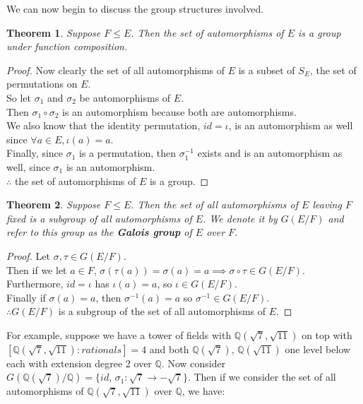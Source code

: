 \documentclass[11pt]{amsart}
\newtheorem{theorem}{Theorem}[section]
\theoremstyle{definition}
\newcommand{\rationals}{\mathbb{Q}}
\begin{document}
We can now begin to discuss the group structures involved.
\begin{theorem}
	Suppose $F \leq E$. Then the set of automorphisms of $E$ is a group under function composition.
\end{theorem}
\begin{proof}
	Now clearly the set of all automorphisms of $E$ is a subset of $S_E$, the set of permutations on $E$. \\
	So let $\sigma_1$ and $\sigma_2$ be automorphisms of $E$. \\
	Then $\sigma_1 \circ \sigma_2$ is an automorphism because both are automorphisms. \\
	We also know that the identity permutation, $id = \iota$, is an automorphism as well since $\forall a \in E, \iota(a) = a$. \\
	Finally, since $\sigma_1$ is a permutation, then $\sigma_1^{-1}$ exists and is an automorphism as well, since $\sigma_1$
	is an automorphism. \\
	$\therefore$ the set of automorphisms of $E$ is a group.
\end{proof}
\begin{theorem}
	Suppose $F \leq E$. Then the set of all automorphisms of $E$ leaving $F$ fixed is a subgroup of all automorphisms of $E$. We denote
	it by $G(E/F)$ and refer to this group as the \textbf{Galois group} of $E$ over $F$.
\end{theorem}
\begin{proof}
	Let $\sigma, \tau \in G(E/F)$. \\
	Then if we let $a \in F$, $\sigma(\tau(a)) = \sigma(a) = a \implies \sigma \circ \tau \in G(E/F)$. \\
	Furthermore, $id = \iota$ has $\iota(a) = a$, so $\iota \in G(E/F)$. \\
	Finally if $\sigma(a) = a$, then $\sigma^{-1}(a) = a$ so $\sigma^{-1} \in G(E/F)$. \\
	$\therefore G(E/F)$ is a subgroup of the set of all automorphisms of $E$.
\end{proof}
For example, suppose we have a tower of fields with $\rationals(\sqrt{7}, \sqrt{11})$ on top with $[ \rationals(\sqrt{7}, \sqrt{11}) : rationals ] = 4$
and both $\rationals(\sqrt{7})$, $\rationals(\sqrt{11})$ one level below each with extension degree 2 over $\rationals$. Now consider
$G(\rationals(\sqrt{7})/\rationals) = \{ id, \, \sigma_1: \sqrt{7} \to -\sqrt{7} \}$. Then if we consider the set of all automorphisms of 
$\rationals(\sqrt{7}, \sqrt{11})$ over $\rationals$, we have:
\end{document}
